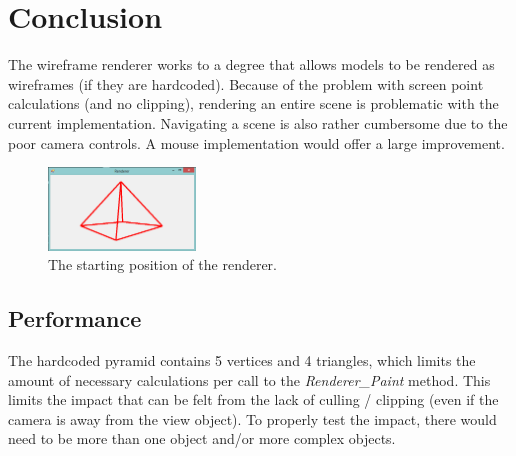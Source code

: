 \section{Conclusion}
The wireframe renderer works to a degree that allows models to be rendered as wireframes (if they are hardcoded). Because of the problem with screen point calculations (and no clipping), rendering an entire scene is problematic with the current implementation. Navigating a scene is also rather cumbersome due to the poor camera controls. A mouse implementation would offer a large improvement.

\begin{figure}[h!]
  \centering
    \includegraphics[width=0.35\textwidth]{Screenshots/StartingPosition}
  \caption{The starting position of the renderer.}
\end{figure}

\subsection{Performance}
The hardcoded pyramid contains 5 vertices and 4 triangles, which limits the amount of necessary calculations per call to the \textit{Renderer\_Paint} method. This limits the impact that can be felt from the lack of culling / clipping (even if the camera is away from the view object). To properly test the impact, there would need to be more than one object and/or more complex objects.